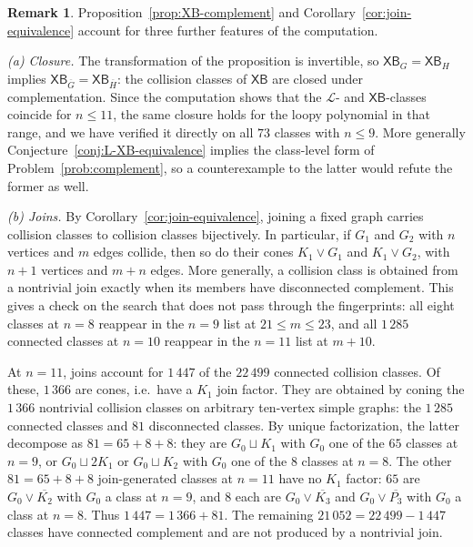 \documentclass[11pt]{article}
\theoremstyle{plain}
\theoremstyle{definition}
\newtheorem{remark}[theorem]{Remark}
\renewcommand{\mathcal}{\mathscr}
\newcommand{\LL}{\mathcal{L}}    %
\newcommand{\XB}{\mathsf{XB}} %
\numberwithin{equation}{section}
\begin{document}
\begin{remark}
 \label{rem:complementation}
Proposition~\ref{prop:XB-complement} and Corollary~\ref{cor:join-equivalence}
account for three further features of the computation.

\emph{(a) Closure.}  The transformation of the proposition is invertible, so
$\XB_G=\XB_H$ implies $\XB_{\overline G}=\XB_{\overline H}$: the collision classes
of $\XB$ are closed under complementation.  Since the computation shows that
the $\LL$- and $\XB$-classes coincide for $n\le11$, the same closure holds for
the loopy polynomial in that range, and we have verified it directly on all
$73$ classes with $n\le9$.  More generally
Conjecture~\ref{conj:L-XB-equivalence} implies the class-level form of
Problem~\ref{prob:complement}, so a counterexample to the latter would refute
the former as well.

\emph{(b) Joins.}
By Corollary~\ref{cor:join-equivalence}, joining a fixed graph carries
collision classes to collision classes bijectively.  In particular, if $G_1$
and $G_2$ with $n$ vertices and $m$ edges collide, then so do their cones
$K_1\vee G_1$ and $K_1\vee G_2$, with $n+1$ vertices and $m+n$ edges.  More
generally, a collision class is obtained from a nontrivial join exactly when
its members have disconnected complement.  This
gives a check on the search that does not pass through the fingerprints: all
eight classes at $n=8$ reappear in the $n=9$ list at $21\le m\le23$, and all
$1\,285$ connected classes at $n=10$ reappear in the $n=11$ list at $m+10$.

At $n=11$, joins account for $1\,447$ of the $22\,499$ connected collision
classes.  Of these, $1\,366$ are cones, i.e.\ have a $K_1$ join factor.  They
are obtained by coning the $1\,366$ nontrivial collision classes on arbitrary
ten-vertex simple graphs: the $1\,285$ connected classes and $81$ disconnected
classes.  By unique factorization, the latter decompose as
$81=65+8+8$: they are $G_0\sqcup K_1$ with $G_0$ one of the $65$ classes at
$n=9$, or $G_0\sqcup2K_1$ or $G_0\sqcup K_2$ with $G_0$ one of the $8$
classes at $n=8$.  The other $81=65+8+8$ join-generated classes at $n=11$
have no $K_1$ factor: $65$ are $G_0\vee\overline{K_2}$ with $G_0$ a class at
$n=9$, and $8$ each are $G_0\vee\overline{K_3}$ and
$G_0\vee\overline{P_3}$ with $G_0$ a class at $n=8$.
Thus $1\,447=1\,366+81$.  The remaining $21\,052=22\,499-1\,447$ classes have
connected complement and are not produced by a nontrivial join.



\end{remark}
\end{document}
